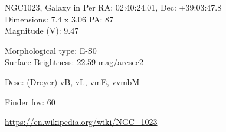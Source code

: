 \begin{block}{NGC1023, Galaxy in Per}
    RA: 02:40:24.01, Dec: +39:03:47.8 \\ 
    Dimensions: 7.4 x 3.06 PA: 87 \\ 
    Magnitude (V): 9.47

    Morphological type: E-S0 \\ 
    Surface Brightness: 22.59 mag/arcsec2 

    Desc: (Dreyer) vB, vL, vmE, vvmbM 

    Finder fov: 60 

    \url{https://en.wikipedia.org/wiki/NGC_1023} 
\end{block}